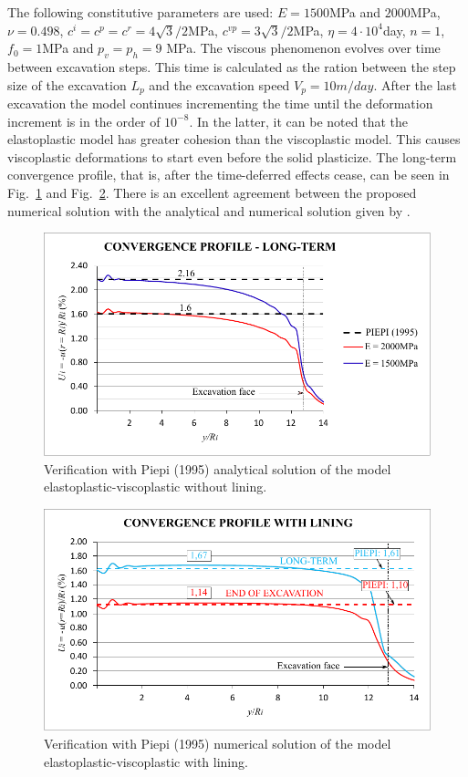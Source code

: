 \documentclass[Journal,letterpaper]{ascelike-new}
\begin{document}
The following constitutive parameters are used: $E=1500$MPa and $2000$MPa, $\nu=0.498$, $c^i=c^p=c^r =4\sqrt{3}/2$MPa, $ c^{vp}=3\sqrt{3}/2$MPa, $\eta = 4 \cdot 10^4$day, $n=1$, $f_0=1$MPa and $p_v=p_h=9$ MPa. The viscous phenomenon evolves over time between excavation steps. This time is calculated as the ration between the step size of the excavation $L_p$ and the excavation speed $V_p = 10m/day$. After the last excavation the model continues incrementing the time until the deformation increment is in the order of $10^{-8}$. In the latter, it can be noted that the elastoplastic model has greater cohesion than the viscoplastic model. This causes viscoplastic deformations to start even before the solid plasticize. The long-term convergence profile, that is, after the time-deferred effects cease, can be seen in Fig.~\ref{convergence_profile_piepi} and Fig.~\ref{convergence_profile_piepi_with_lining}. There is an excellent agreement between the proposed numerical solution with the analytical and numerical solution given by .

\begin{figure}
	\centering
	\includegraphics[scale = 1.0]{convergence_profile_piepi.pdf}
	\caption{\label{convergence_profile_piepi}Verification with Piepi (1995) analytical solution of the model elastoplastic-viscoplastic without lining.}
\end{figure}

\begin{figure}
	\centering
	\includegraphics[scale = 1.0]{convergence_profile_piepi_with_lining.pdf}
	\caption{\label{convergence_profile_piepi_with_lining}Verification with Piepi (1995) numerical solution of the model elastoplastic-viscoplastic with lining.}
\end{figure}
\end{document}
